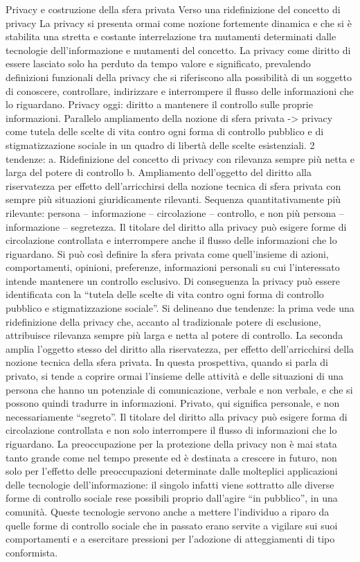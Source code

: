 Privacy e costruzione della sfera privata
Verso una ridefinizione del concetto di privacy
La privacy si presenta ormai come nozione fortemente dinamica e che si è stabilita una stretta e costante interrelazione tra mutamenti determinati dalle tecnologie dell’informazione e mutamenti del concetto. La privacy come diritto di essere lasciato solo ha perduto da tempo valore e significato, prevalendo definizioni funzionali della privacy che si riferiscono alla possibilità di un soggetto di conoscere, controllare, indirizzare e interrompere il flusso delle informazioni che lo riguardano.
Privacy oggi: diritto a mantenere il controllo sulle proprie informazioni.
Parallelo ampliamento della nozione di sfera privata -> privacy come tutela delle scelte di vita contro ogni forma di controllo pubblico e di stigmatizzazione sociale in un quadro di libertà delle scelte esistenziali.
2 tendenze: 
a.	Ridefinizione del concetto di privacy con rilevanza sempre più netta e larga del potere di controllo
b.	Ampliamento dell’oggetto del diritto alla riservatezza per effetto dell’arricchirsi della nozione tecnica di sfera privata con sempre più situazioni giuridicamente rilevanti.
Sequenza quantitativamente più rilevante: persona – informazione – circolazione – controllo, e non più persona – informazione – segretezza. Il titolare del diritto alla privacy può esigere forme di circolazione controllata e interrompere anche il flusso delle informazioni che lo riguardano. 
Si può così definire la sfera privata come quell’insieme di azioni, comportamenti, opinioni, preferenze, informazioni personali su cui l’interessato intende mantenere un controllo esclusivo. Di conseguenza la privacy può essere identificata con la “tutela delle scelte di vita contro ogni forma di controllo pubblico e stigmatizzazione sociale”.
Si delineano due tendenze: la prima vede una ridefinizione della privacy che, accanto al tradizionale potere di esclusione, attribuisce rilevanza sempre più larga e netta al potere di controllo. La seconda amplia l’oggetto stesso del diritto alla riservatezza, per effetto dell’arricchirsi della nozione tecnica della sfera privata.
In questa prospettiva, quando si parla di privato, si tende a coprire ormai l’insieme delle attività e delle situazioni di una persona che hanno un potenziale di comunicazione, verbale e non verbale, e che si possono quindi tradurre in informazioni. Privato, qui significa personale, e non necessariamente “segreto”.
Il titolare del diritto alla privacy può esigere forma di circolazione controllata e non solo interrompere il flusso di informazioni che lo riguardano. La preoccupazione per la protezione della privacy non è mai stata tanto grande come nel tempo presente ed è destinata a crescere in futuro, non solo per l’effetto delle preoccupazioni determinate dalle molteplici applicazioni delle tecnologie dell’informazione: il singolo infatti viene sottratto alle diverse forme di controllo sociale rese possibili proprio dall’agire “in pubblico”, in una comunità. Queste tecnologie servono anche a mettere l’individuo a riparo da quelle forme di controllo sociale che in passato erano servite a vigilare sui suoi comportamenti e a esercitare pressioni per l’adozione di atteggiamenti di tipo conformista.

